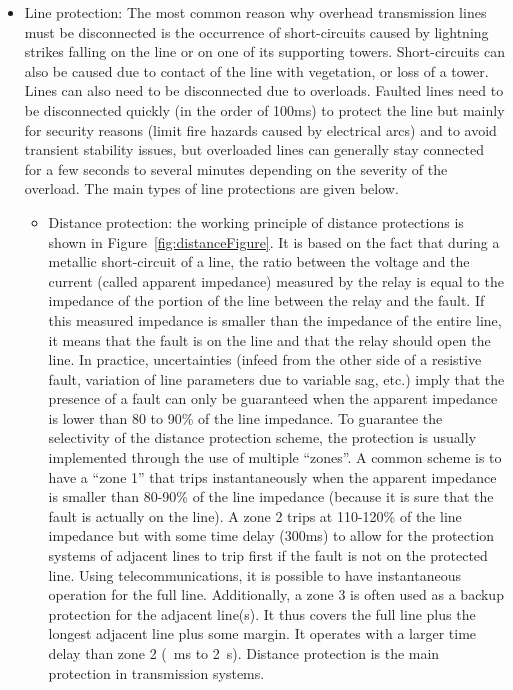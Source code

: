 \begin{itemize}
    \item Line protection: The most common reason why overhead transmission lines must be disconnected is the occurrence of short-circuits caused by lightning strikes falling on the line or on one of its supporting towers. Short-circuits can also be caused due to contact of the line with vegetation, or loss of a tower. Lines can also need to be disconnected due to overloads. Faulted lines need to be disconnected quickly (in the order of 100ms) to protect the line but mainly for security reasons (limit fire hazards caused by electrical arcs) and to avoid transient stability issues, but overloaded lines can generally stay connected for a few seconds to several minutes depending on the severity of the overload. The main types of line protections are given below.
    \begin{itemize}
        \item Distance protection: the working principle of distance protections is shown in Figure~\ref{fig:distanceFigure}. It is based on the fact that during a metallic short-circuit of a line, the ratio between the voltage and the current (called apparent impedance) measured by the relay is equal to the impedance of the portion of the line between the relay and the fault. If this measured impedance is smaller than the impedance of the entire line, it means that the fault is on the line and that the relay should open the line. In practice, uncertainties (infeed from the other side of a resistive fault, variation of line parameters due to variable sag, etc.) imply that the presence of a fault can only be guaranteed when the apparent impedance is lower than 80 to 90\% of the line impedance. To guarantee the selectivity of the distance protection scheme, the protection is usually implemented through the use of multiple ``zones''. A common scheme is to have a ``zone 1'' that trips instantaneously when the apparent impedance is smaller than 80-90\% of the line impedance (because it is sure that the fault is actually on the line). A zone 2 trips at 110-120\% of the line impedance but with some time delay (\eg 300ms) to allow for the protection systems of adjacent lines to trip first if the fault is not on the protected line. Using telecommunications, it is possible to have instantaneous operation for the full line. Additionally, a zone 3 is often used as a backup protection for the adjacent line(s). It thus covers the full line plus the longest adjacent line plus some margin. It operates with a larger time delay than zone 2 (~ms to 2~s). Distance protection is the main protection in transmission systems.

\end{itemize}
\end{itemize}

